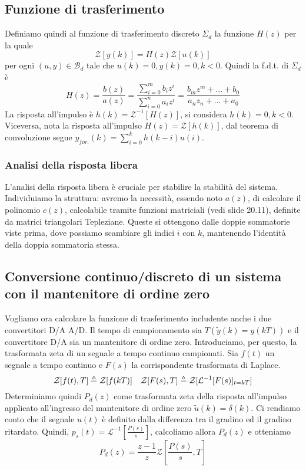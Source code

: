 \documentclass[11pt]{article}
\newcommand{\trz}{\mathcal{Z}}
\begin{document}
\subsection{Funzione di trasferimento}
Definiamo quindi al funzione di trasferimento discreto $\Sigma_d$ la funzione $H(z)$ per la quale
\begin{displaymath}
    \trz[y(k)] = H(z)\trz[u(k)]
\end{displaymath}
per ogni $(u,y) \in \mathcal{B}_d$ tale che $u(k)=0, y(k)=0, k<0$.
Quindi la f.d.t. di $\Sigma_d$ è
\begin{displaymath}
    H(z) = \frac{b(z)}{a(z)} = \frac{\sum_{i=0}^m b_iz^i}{\sum_{i=0}^n a_iz^i} = \frac{b_mz^m+...+b_0}{a_nz_n+...+a_0}
\end{displaymath}
La risposta all'impulso è $h(k)=\trz^{-1}[H(z)]$, si considera $h(k)=0, k<0$. Viceversa, nota la risposta all'impulso $H(z)=\trz[h(k)]$, dal teorema di convoluzione segue $y_{for.}(k)=\sum_{i=0}^k h(k-i)u(i)$.
\subsubsection{Analisi della risposta libera}
L'analisi della risposta libera è cruciale per stabilire la stabilità del sistema. Individuiamo la struttura: avremo la necessità, essendo noto $a(z)$, di calcolare il polinomio $c(z)$, calcolabile tramite funzioni matriciali (vedi slide 20.11), definite da matrici triangolari Tepleziane. Queste si ottengono dalle doppie sommatorie viste prima, dove possiamo scambiare gli indici $i$ con $k$, mantenendo l'identità della doppia sommatoria stessa.
\subsection{Conversione continuo/discreto di un sistema con il mantenitore di ordine zero}
Vogliamo ora calcolare la funzione di trasferimento includente anche i due convertitori D/A A/D. Il tempo di campionamento sia $T(\tilde{y}(k) = y(kT))$ e il convertitore D/A sia un mantenitore di ordine zero. Introduciamo, per questo,  la trasformata zeta di un segnale a tempo continuo campionati. Sia $f(t)$ un segnale a tempo continuo e $F(s)$ la corrispondente trasformata di Laplace.
\begin{displaymath}
    \trz[f(t), T] \triangleq \trz[f(kT)] \hspace{10px} \trz[F(s), T]\triangleq \trz[\mathcal{L}^{-1}[F(s)]_{t=kT}]
\end{displaymath}
Determiniamo quindi $P_d(z)$ come trasformata zeta della risposta all'impulso applicato all'ingresso del mantenitore di ordine zero $\tilde{u}(k) = \delta(k)$.
Ci rendiamo conto che il segnale $u(t)$ è definito dalla differenza tra il gradino ed il gradino ritardato. Quindi, $p_s(t) = \mathcal{L}^{-1} \left[\frac{P(s)}{s}\right]$, calcoliamo allora $P_d(z)$ e otteniamo
\begin{displaymath}
    P_d(z)=\frac{z-1}{z} \trz \left[\frac{P(s)}{s}, T\right]
\end{displaymath}
\end{document}
